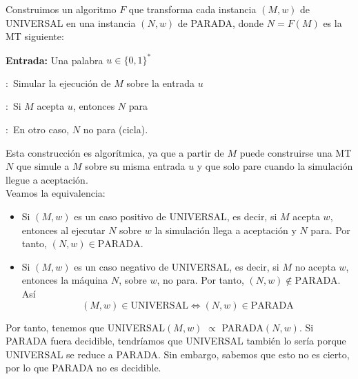 \begin{ejercicio}
    

    Construimos un algoritmo $F$ que transforma cada instancia $(M,w)$ de UNIVERSAL en una instancia $(N,w)$
    de PARADA, donde $N = F(M)$ es la MT siguiente:

    \begin{algorithm}
        \caption{Máquina de Turing $N = F(M)$}
        \label{algorithm:reduccion-universal-parada}
        \begin{algorithmic}
            \State \textbf{Entrada:} Una palabra $u \in \{0,1\}^*$

            :\ Simular la ejecución de $M$ sobre la entrada $u$

            :\ Si $M$ acepta $u$, entonces $N$ para

            :\ En otro caso, $N$ no para (cicla).
        \end{algorithmic}
    \end{algorithm}

    Esta construcción es algorítmica, ya que a partir de $M$ puede construirse una MT $N$ que simule a $M$ sobre su 
    misma entrada $u$ y que solo pare cuando la simulación llegue a aceptación. \\

    Veamos la equivalencia:

    \begin{itemize}
        \item Si $(M,w)$ es un caso positivo de UNIVERSAL, es decir, si $M$ acepta $w$, entonces al ejecutar $N$ sobre
        $w$ la simulación llega a aceptación y $N$ para. Por tanto, $(N,w) \in \text{PARADA}$.
        \item Si $(M,w)$ es un caso negativo de UNIVERSAL, es decir, si $M$ no acepta $w$, entonces la máquina $N$,
        sobre $w$, no para. Por tanto, $(N, w) \notin \text{PARADA}$. Así 
        $$(M,w) \in \text{UNIVERSAL} \iff (N,w) \in \text{PARADA}$$
    \end{itemize}

    Por tanto, tenemos que UNIVERSAL$(M,w)$ $\propto$ PARADA$(N,w)$. Si PARADA fuera decidible, tendríamos que UNIVERSAL también
    lo sería porque UNIVERSAL se reduce a PARADA. Sin embargo, sabemos que esto no es cierto, por lo que PARADA
    no es decidible.
\end{ejercicio}




